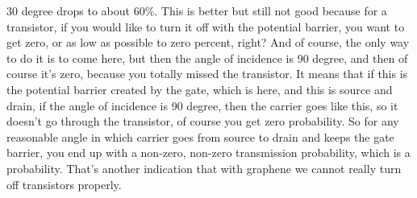 30 degree drops to about 60\%. This is better but still not good because for a transistor, if you would like to turn it off with the potential barrier, you want to get zero, or as low as possible to zero percent, right? And of course, the only way to do it is to come here, but then the angle of incidence is 90 degree, and then of course it's zero, because you totally missed the transistor. It means that if this is the potential barrier created by the gate, which is here, and this is source and drain, if the angle of incidence is 90 degree, then the carrier goes like this, so it doesn't go through the transistor, of course you get zero probability. So for any reasonable angle in which carrier goes from source to drain and keeps the gate barrier, you end up with a non-zero, non-zero transmission probability, which is a probability. That's another indication that with graphene we cannot really turn off transistors properly.
